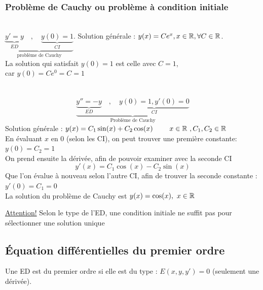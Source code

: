 \documentclass[12pt,a4paper]{article}
\begin{document}
\subsubsection{Problème de Cauchy ou problème à condition initiale}
\\
$\underbrace{\underbrace{y' = y}_{ED}\quad , \quad \underbrace{y(0) = 1}_{CI}}_{\text{problème de Cauchy}}$. Solution générale : $y(x) = Ce^x, x \in \mathbb{R}, \forall C \in \mathbb{R}$.\\
La solution qui satisfait $y(0) = 1$ est celle avec $C = 1$, \\car $y(0) = Ce^0 = C = 1$\\
\\
\\
\begin{equation*}
	\underbrace{\underbrace{y'' = -y}_{ED} \quad , \quad\underbrace{y(0)= 1, y'(0) =0}_{CI}}_{\text{Problème de Cauchy}}
\end{equation*}
Solution générale : $y(x) = C_1\sin(x) + C_2\cos(x)\qquad  \ x \in \mathbb{R} \ , C_1, C_2 \in \mathbb{R}$\\
En évaluant $x$ en 0 (selon les CI), on peut trouver une première constante: $y(0) = C_2 = 1$\\
On prend ensuite la dérivée, afin de pouvoir examiner avec la seconde CI
\begin{equation*}
	y'(x) = C_1\cos(x) - C_2\sin(x)
\end{equation*}
Que l'on évalue à nouveau selon l'autre CI, afin de trouver la seconde constante :
$y'(0) = C_1 = 0$\\
La solution du problème de Cauchy est $y(x) = \cos(x), \ x\in\mathbb{R}$
\begin{boite}
	\underline{Attention!} Selon le type de l'ED, une condition initiale ne suffit pas pour sélectionner une solution unique
\end{boite}

\subsection{Équation différentielles du premier ordre}
Une ED est du premier ordre si elle est du type : $E(x,y,y') = 0$ (seulement une dérivée).
\end{document}
